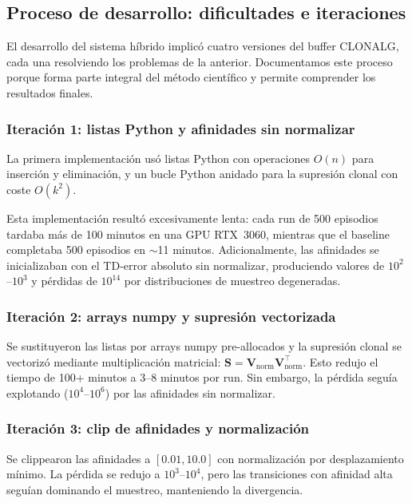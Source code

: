 \documentclass[12pt,a4paper]{article}
\begin{document}
\subsection{Proceso de desarrollo: dificultades e iteraciones}
 
El desarrollo del sistema híbrido implicó cuatro versiones del buffer
CLONALG, cada una resolviendo los problemas de la anterior. Documentamos
este proceso porque forma parte integral del método científico y permite
comprender los resultados finales.
 
\subsubsection{Iteración 1: listas Python y afinidades sin normalizar}
 
La primera implementación usó listas Python con operaciones $O(n)$ para
inserción y eliminación, y un bucle Python anidado para la supresión clonal
con coste $O(k^2)$.
 
Esta implementación resultó excesivamente lenta: cada run de 500 episodios
tardaba más de 100 minutos en una GPU RTX~3060, mientras que el baseline
completaba 500 episodios en $\sim$11 minutos. Adicionalmente, las
afinidades se inicializaban con el TD-error absoluto sin normalizar,
produciendo valores de $10^2$--$10^3$ y pérdidas de $10^{14}$ por
distribuciones de muestreo degeneradas.
 
\subsubsection{Iteración 2: arrays numpy y supresión vectorizada}
 
Se sustituyeron las listas por arrays numpy pre-allocados y la supresión
clonal se vectorizó mediante multiplicación matricial:
$\mathbf{S} = \mathbf{V}_{\text{norm}} \mathbf{V}_{\text{norm}}^\top$.
Esto redujo el tiempo de 100+ minutos a 3--8 minutos por run. Sin embargo,
la pérdida seguía explotando ($10^4$--$10^6$) por las afinidades sin
normalizar.
 
\subsubsection{Iteración 3: clip de afinidades y normalización}
 
Se clippearon las afinidades a $[0.01, 10.0]$ con normalización por
desplazamiento mínimo. La pérdida se redujo a $10^3$--$10^4$, pero las
transiciones con afinidad alta seguían dominando el muestreo, manteniendo
la divergencia.
 
\end{document}
